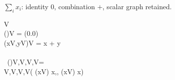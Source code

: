 \documentclass{article}
\begin{document}
\begin{preview}\begin{minipage}{19cm}
\small
$\sum_i x_i$: identity $0$, combination $+$, scalar graph retained.
\begin{FortressCode}
   \llbracket{}V\rrbracket \\
\2\+(\ultrathin)\COLONOP{}V = (0.0) \\
  (x\COLONOP{}V,y\COLONOP{}V)\COLONOP{}V = x + y\- \\
 \\
\, \mathord{\sum}(\ultrathin)\COLON{}\llbracket{}V,V,V,V\rrbracket = \\
\2\+\llbracket{}V,V,V,V\rrbracket\bigl( (x\COLONOP{}V) \Rightarrow x,, (x\COLONOP{}V) \Rightarrow x\bigr)\-
\end{FortressCode}
\end{minipage}\end{preview}
\end{document}
